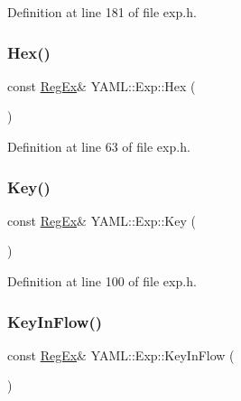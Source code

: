 Definition at line 181 of file exp.\+h.

\mbox{\label{namespace_y_a_m_l_1_1_exp_adce10005c20c3202cfea2121eb582968}} 
\subsubsection{\texorpdfstring{Hex()}{Hex()}}
{\footnotesize\ttfamily const \mbox{\hyperlink{class_y_a_m_l_1_1_reg_ex}{Reg\+Ex}}\& Y\+A\+M\+L\+::\+Exp\+::\+Hex (\begin{DoxyParamCaption}{ }\end{DoxyParamCaption})\hspace{0.3cm}{\ttfamily [inline]}}



Definition at line 63 of file exp.\+h.

\mbox{\label{namespace_y_a_m_l_1_1_exp_ab4c7653c038cb3a6aaba7806dec035a8}} 
\subsubsection{\texorpdfstring{Key()}{Key()}}
{\footnotesize\ttfamily const \mbox{\hyperlink{class_y_a_m_l_1_1_reg_ex}{Reg\+Ex}}\& Y\+A\+M\+L\+::\+Exp\+::\+Key (\begin{DoxyParamCaption}{ }\end{DoxyParamCaption})\hspace{0.3cm}{\ttfamily [inline]}}



Definition at line 100 of file exp.\+h.

\mbox{\label{namespace_y_a_m_l_1_1_exp_ac922759fe8aee657aa3a4ef2769bf4ee}} 
\subsubsection{\texorpdfstring{KeyInFlow()}{KeyInFlow()}}
{\footnotesize\ttfamily const \mbox{\hyperlink{class_y_a_m_l_1_1_reg_ex}{Reg\+Ex}}\& Y\+A\+M\+L\+::\+Exp\+::\+Key\+In\+Flow (\begin{DoxyParamCaption}{ }\end{DoxyParamCaption})\hspace{0.3cm}{\ttfamily [inline]}}



